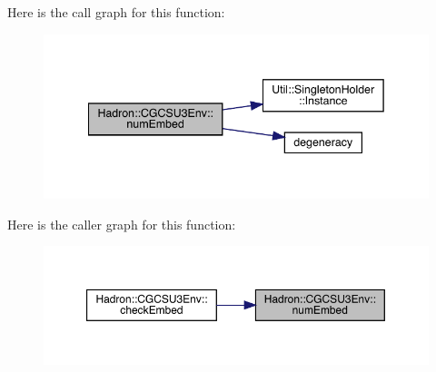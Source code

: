 Here is the call graph for this function\+:
\nopagebreak
\begin{figure}[H]
\begin{center}
\leavevmode
\includegraphics[width=342pt]{d4/d47/namespaceHadron_1_1CGCSU3Env_acc35e8f63cd5a1ffe14a963df3f2c1fd_cgraph}
\end{center}
\end{figure}
Here is the caller graph for this function\+:
\nopagebreak
\begin{figure}[H]
\begin{center}
\leavevmode
\includegraphics[width=350pt]{d4/d47/namespaceHadron_1_1CGCSU3Env_acc35e8f63cd5a1ffe14a963df3f2c1fd_icgraph}
\end{center}
\end{figure}
